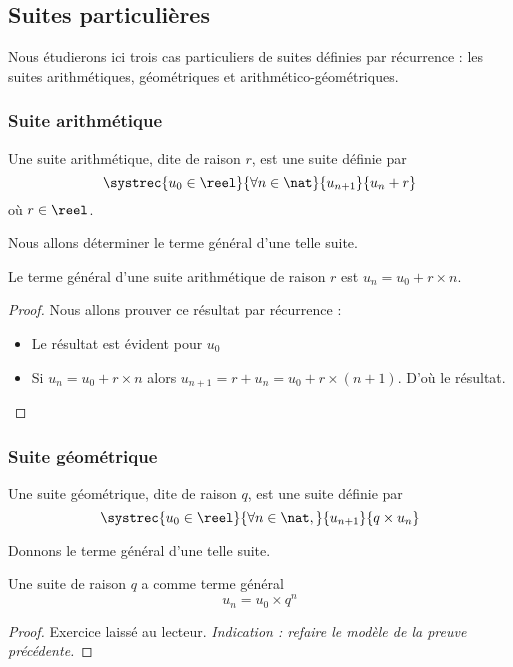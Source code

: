 \subsection{Suites particulières}

Nous étudierons ici trois cas particuliers de suites définies par récurrence : les suites arithmétiques, géométriques et arithmético-géométriques.

\subsubsection{Suite arithmétique}

\begin{defi}
    Une suite arithmétique, dite de raison $r$, est une suite définie par $$\systrec{u_0\in\reel}{\forall n\in\nat}{u_{n+1}}{u_n+r}$$ où $r\in\reel$.
\end{defi}

Nous allons déterminer le terme général d'une telle suite.

\begin{prop}
    Le terme général d'une suite arithmétique de raison $r$ est $u_n = u_0+r\times n$.
\end{prop}
\begin{proof}
    Nous allons prouver ce résultat par récurrence :
    \begin{itemize}[label=$\bullet$]
        \item Le résultat est évident pour $u_0$
        \item Si $u_n=u_0+r\times n$ alors $u_{n+1}=r+u_n=u_0+r\times (n+1)$. D'où le résultat.
    \end{itemize}
\end{proof}

\subsubsection{Suite géométrique}

\begin{defi}
    Une suite géométrique, dite de raison $q$, est une suite définie par $$\systrec{u_0\in\reel}{\forall n \in\nat,}{u_{n+1}}{q\times u_n}$$
\end{defi}

Donnons le terme général d'une telle suite.

\begin{prop}
    Une suite de raison $q$ a comme terme général $$u_n = u_0\times q^n$$
\end{prop}
\begin{proof}
    Exercice laissé au lecteur. \textit{Indication : refaire le modèle de la preuve précédente.}
\end{proof}

